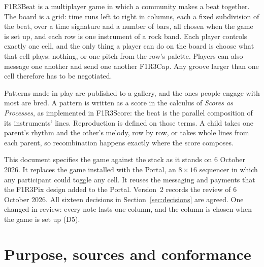 \documentclass[11pt,a4paper]{article}
\newcommand{\caps}[1]{{\addfontfeatures{LetterSpace=12}\MakeUppercase{#1}}}
\begin{document}
\begin{center}
\begin{minipage}{0.9\linewidth}
{\spartanbold\fontsize{8.5}{10}\selectfont\caps{Summary}}\par\smallskip
F1R3Beat is a multiplayer game in which a community makes a beat together. The board is a
grid: time runs left to right in columns, each a fixed subdivision of the beat, over a time
signature and a number of bars, all chosen when the game is set up, and each row is one instrument of a rock band. Each player
controls exactly one cell, and the only thing a player can do on the board is choose what that
cell plays: nothing, or one pitch from the row's palette. Players can also message one another
and send one another F1R3Cap. Any groove larger than one cell therefore has to be negotiated.

Patterns made in play are published to a gallery, and the ones people engage with most are
bred. A pattern is written as a score in the calculus of \emph{Scores as Processes}, as
implemented in F1R3Score: the beat is the parallel composition of its instruments' lines.
Reproduction is defined on those terms. A child takes one parent's rhythm and the other's
melody, row by row, or takes whole lines from each parent, so recombination happens exactly
where the score composes.

This document specifies the game against the stack as it stands on 6 October 2026. It
replaces the game installed with the Portal, an $8\times16$ sequencer in which any participant
could toggle any cell. It reuses the messaging and payments that the F1R3Pix design added to
the Portal. Version~2 records the review of 6 October 2026. All sixteen decisions in
Section~\ref{sec:decisions} are agreed. One changed in review: every note lasts one column,
and the column is chosen when the game is set up (D5).
\end{minipage}
\end{center}

\vspace{2mm}
\begingroup\small\setlength{\parskip}{0pt}\tableofcontents\endgroup
\newpage

\section{Purpose, sources and conformance}
\end{document}
